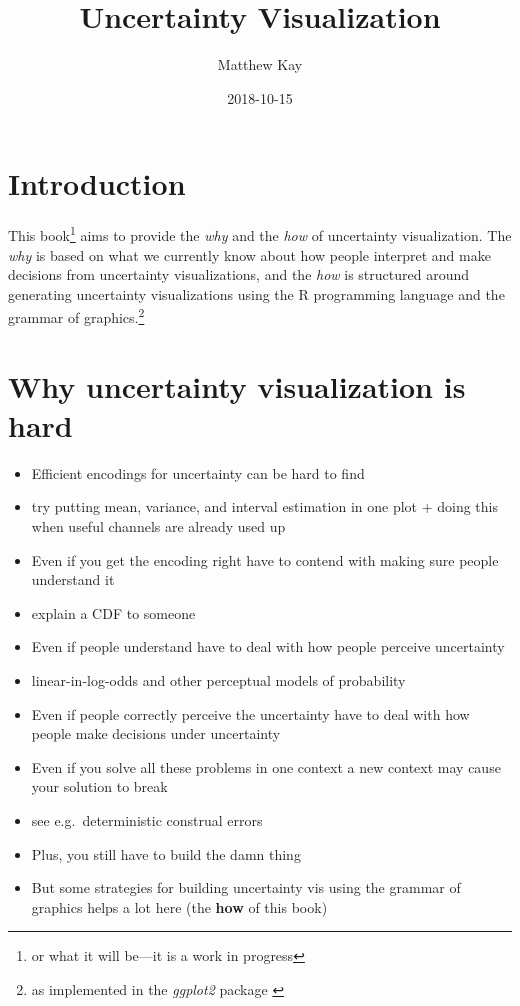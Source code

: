 \documentclass[]{book}
\title{Uncertainty Visualization}
\author{Matthew Kay}
\date{2018-10-15}
\providecommand{\tightlist}{%
  \setlength{\itemsep}{0pt}\setlength{\parskip}{0pt}}
\let\rmarkdownfootnote\footnote%
\def\footnote{\protect\rmarkdownfootnote}
\theoremstyle{definition}
\theoremstyle{definition}
\theoremstyle{definition}
\theoremstyle{remark}
\begin{document}
\maketitle

{
\setcounter{tocdepth}{1}
\tableofcontents
}
\chapter{Introduction}\label{ch-intro}

This book\footnote{or what it will be---it is a work in progress} aims
to provide the \emph{why} and the \emph{how} of uncertainty
visualization. The \emph{why} is based on what we currently know about
how people interpret and make decisions from uncertainty visualizations,
and the \emph{how} is structured around generating uncertainty
visualizations using the R programming language and the grammar of
graphics.\footnote{as implemented in the \emph{ggplot2} package
  \citep{R-ggplot2}}

\chapter{Why uncertainty visualization is hard}\label{ch-why-hard}

\begin{itemize}
\tightlist
\item
  Efficient encodings for uncertainty can be hard to find
\item
  try putting mean, variance, and interval estimation in one plot +
  doing this when useful channels are already used up
\item
  Even if you get the encoding right have to contend with making sure
  people understand it
\item
  explain a CDF to someone
\item
  Even if people understand have to deal with how people perceive
  uncertainty
\item
  linear-in-log-odds and other perceptual models of probability
\item
  Even if people correctly perceive the uncertainty have to deal with
  how people make decisions under uncertainty
\item
  Even if you solve all these problems in one context a new context may
  cause your solution to break
\item
  see e.g.~deterministic construal errors
\item
  Plus, you still have to build the damn thing
\item
  But some strategies for building uncertainty vis using the grammar of
  graphics helps a lot here (the \textbf{how} of this book)
\end{itemize}
\end{document}
